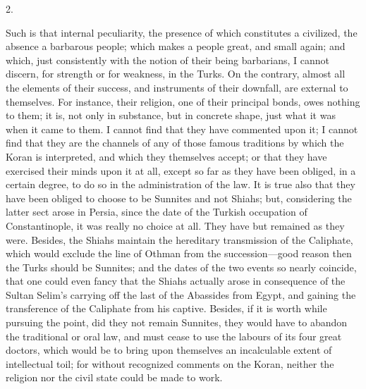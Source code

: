 2.

Such is that internal
peculiarity, the presence of which constitutes a civilized, the
absence a barbarous people; which makes a people great, and small
again; and which, just consistently with the notion of their being
barbarians, I cannot discern, for strength or for weakness, in the
Turks. On the contrary, almost all the elements of their success, and
instruments of their downfall, are external to themselves. For
instance, their religion, one of their principal bonds, owes nothing
to them; it is, not only in substance, but in concrete shape, just
what it was when it came to them. I cannot find that they have
commented upon it; I cannot find that they are the channels of any of
those famous traditions by which the Koran is interpreted, and which
they themselves accept; or that they have exercised their minds upon
it at all, except so far as they have been obliged, in a certain
degree, to do so in the administration of the law. It is true also
that they have been obliged to choose to be Sunnites and not Shiahs;
but, considering the latter sect arose in Persia, since the date of
the Turkish occupation of Constantinople, it was really no choice at
all. They have but remained as they were. Besides, the Shiahs maintain the hereditary transmission of the Caliphate, which would
exclude the line of Othman from the succession—good reason then the
Turks should be Sunnites; and the dates of the two events so nearly
coincide, that one could even fancy that the Shiahs actually arose in
consequence of the Sultan Selim's carrying off the last of the
Abassides from Egypt, and gaining the transference of the Caliphate
from his captive. Besides, if it is worth while pursuing the point,
did they not remain Sunnites, they would have to abandon the
traditional or oral law, and must cease to use the labours of its four
great doctors, which would be to bring upon themselves an incalculable
extent of intellectual toil; for without recognized comments on the
Koran, neither the religion nor the civil state could be made to work.

